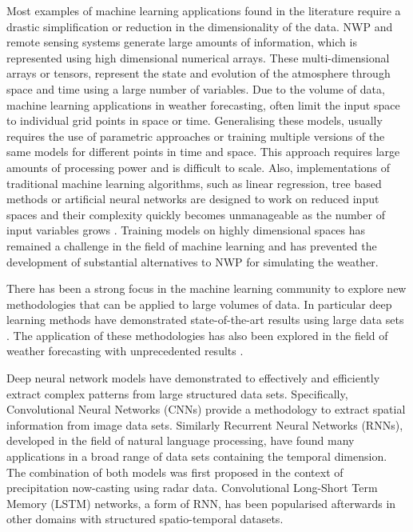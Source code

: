 \medskip

Most examples of machine learning applications found in the literature require a drastic simplification or reduction in the dimensionality of the data. NWP and remote sensing systems generate large amounts of information, which is represented using high dimensional numerical arrays. These multi-dimensional arrays or tensors, represent the state and evolution of the atmosphere through space and time using a large number of variables. Due to the volume of data, machine learning applications in weather forecasting, often limit the input space to individual grid points in space or time. Generalising these models, usually requires the use of parametric approaches or training multiple versions of the same models for different points in time and space. This approach requires large amounts of processing power and is difficult to scale. Also, implementations of traditional machine learning algorithms, such as linear regression, tree based methods or artificial neural networks are designed to work on reduced input spaces and their complexity quickly becomes unmanageable as the number of input variables grows \citep{raible1999statistical,bowler2006steps}. Training models on highly dimensional spaces has remained a challenge in the field of machine learning \citep{fan2013mining} and has prevented the development of substantial alternatives to NWP for simulating the weather. 

\medskip

There has been a strong focus in the machine learning community to explore new methodologies that can be applied to large volumes of data. In particular deep learning \citep{lecun2015deep} methods have demonstrated state-of-the-art results using large data sets \citep{deng2009imagenet,openimages}. The application of these methodologies has also been explored in the field of weather forecasting with unprecedented results \citep{xingjian2015convolutional,liu2016application,rasp2018deep}.

\medskip

Deep neural network models have demonstrated to effectively and efficiently extract complex patterns from large structured data sets. Specifically, Convolutional Neural Networks (CNNs) provide a methodology to extract spatial information from image data sets. Similarly Recurrent Neural Networks (RNNs), developed in the field of natural language processing, have found many applications in a broad range of data sets containing the temporal dimension. The combination of both models was first proposed in the context of precipitation now-casting \citep{xingjian2015convolutional} using radar data. Convolutional Long-Short Term Memory (LSTM) networks, a form of RNN, has been popularised afterwards in other domains with structured spatio-temporal datasets. 

